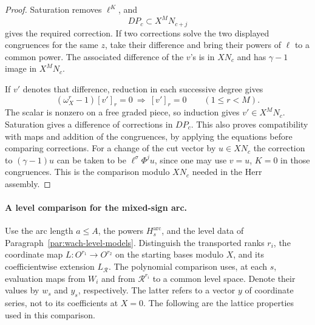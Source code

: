 \begin{proof}
Saturation removes \(\ell^K\), and
\[
 DP_c\subset X^M N_{c+j}
\]
gives the required correction. If two corrections solve the
two displayed congruences for the same \(z\), take their
difference and bring their powers of \(\ell\) to a common power.
The associated difference of the \(v\)'s is in \(XN_c\) and
has \(\gamma-1\) image in \(X^MN_c\).

If \(v'\) denotes that difference, reduction in each successive degree gives
\[
 (\omega_X^r-1)[v']_r=0\ \Longrightarrow\ [v']_r=0
 \qquad(1\le r<M).
\]
The scalar is nonzero on a free graded piece, so induction gives \(v'\in X^MN_c\). Saturation gives a difference of corrections in
\(DP_c\). This also proves compatibility with maps and addition
of the congruences, by applying the equations before comparing
corrections. For a change of the cut vector by \(u\in XN_c\) the
correction to \((\gamma-1)u\) can be taken to be
\(\ell^\sigma\Phi^j u\), since one may use \(v=u\), \(K=0\)
in those congruences. This is the comparison modulo \(XN_c\)
needed in the Herr assembly.

\end{proof}


\paragraph{A level comparison for the mixed-sign arc.}
\label{par:wach-mixed-constant}
Use the arc length \(a\le A\), the powers \(H_s^{\mathrm{arc}}\),
and the level data of Paragraph~\ref{par:wach-level-models}.
Distinguish the transported ranks \(r_i\), the coordinate map
\(L:O^{r_1}\to O^{r_2}\) on the starting bases modulo \(X\),
and its coefficientwise extension \(L_{\mathcal R}\).
The polynomial comparison uses, at each \(s\), evaluation
maps from \(W_i\) and from \(\mathcal R^{r_i}\) to a common level
space. Denote their values by \(w_s\) and \(y_s\), respectively.
The latter refers to a vector \(y\) of coordinate series, not to
its coefficients at \(X=0\). The following are the lattice
properties used in this comparison.

